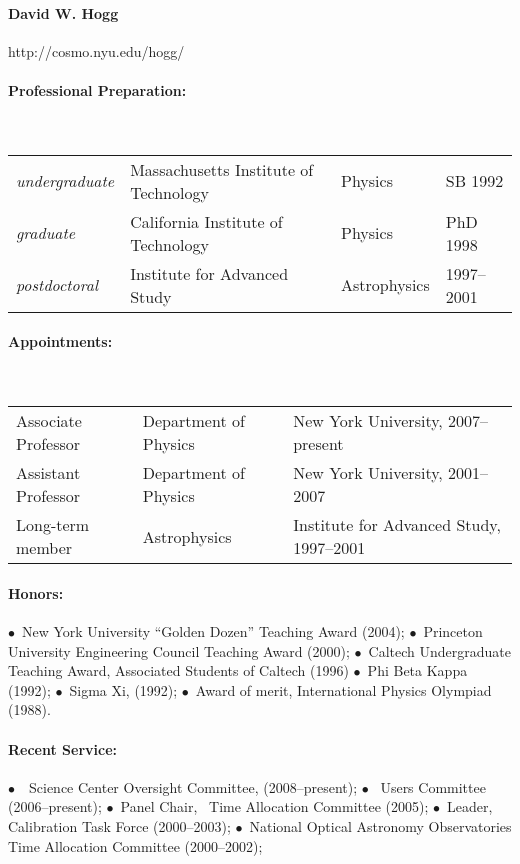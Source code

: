 \documentclass[letterpaper,12pt]{article}
\begin{document}
\paragraph{David W. Hogg} http://cosmo.nyu.edu/hogg/

\paragraph{Professional Preparation:}~\\
\begin{tabular}{llll}
\textsl{undergraduate}
  & Massachusetts Institute of Technology & Physics & SB 1992\\
\textsl{graduate}
  & California Institute of Technology    & Physics & PhD 1998\\
\textsl{postdoctoral}
  & Institute for Advanced Study          & Astrophysics & 1997--2001
\end{tabular}
           
\paragraph{Appointments:}~\\
\begin{tabular}{lll}
Associate Professor & Department of Physics & New York University, 2007--present\\
Assistant Professor & Department of Physics & New York University, 2001--2007\\
Long-term member & Astrophysics & Institute for Advanced Study, 1997--2001 \\
\end{tabular}

\paragraph{Honors:}
$\bullet$~New York University ``Golden Dozen'' Teaching Award (2004);
$\bullet$~Princeton University Engineering Council Teaching Award (2000);
$\bullet$~Caltech Undergraduate Teaching Award, Associated Students of Caltech (1996)
$\bullet$~Phi Beta Kappa (1992);
$\bullet$~Sigma Xi, (1992);
$\bullet$~Award of merit, International Physics Olympiad (1988).

\paragraph{Recent Service:}
$\bullet$~\Spitzer\ Science Center Oversight Committee, (2008--present); 
$\bullet$~ Users Committee (2006--present);
$\bullet$~Panel Chair, \Spitzer\ Time Allocation Committee (2005);
$\bullet$~Leader,  Calibration Task Force (2000--2003);
$\bullet$~National Optical Astronomy Observatories Time Allocation Committee (2000--2002);
\end{document}
